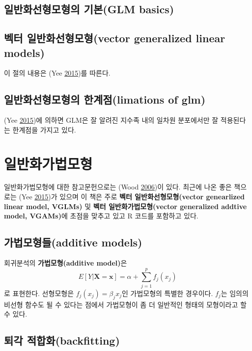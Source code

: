 \documentclass[b5paper,]{book}
\theoremstyle{definition}
\theoremstyle{definition}
\theoremstyle{definition}
\theoremstyle{remark}
\begin{document}
\section{일반화선형모형의 기본(GLM basics)}\label{-glm-basics}

\section{벡터 일반화선형모형(vector generalized linear
models)}\label{-vector-generalized-linear-models}

이 절의 내용은 (Yee \protect\hyperlink{ref-Yee2015}{2015})를 따른다.

\section{일반화선형모형의 한계점(limations of
glm)}\label{-limations-of-glm}

(Yee \protect\hyperlink{ref-Yee2015}{2015})에 의하면 GLM은 잘 알려진
지수족 내의 일차원 분포에서만 잘 적용된다는 한계점을 가지고 있다.

\chapter{일반화가법모형}\label{gam}

일반화가법모형에 대한 참고문헌으로는 (Wood
\protect\hyperlink{ref-Wood2006}{2006})이 있다. 최근에 나온 좋은
책으로는 (Yee \protect\hyperlink{ref-Yee2015}{2015})가 있으며 이 책은
주로 \textbf{벡터 일반화선형모형(vector genearlized linear model,
VGLMs)} 및 \textbf{벡터 일반화가법모형(vector generalized addtive model,
VGAMs)}에 초점을 맞추고 있고 R 코드를 포함하고 있다.

\section{가법모형들(additive models)}\label{additive-models}

회귀분석의 \textbf{가법모형(additive model)}은
\[E[Y|\mathbf{X}=\mathbf{x}]=\alpha+\sum_{j=1}^{p}f_{j}(x_j)\] 로
표현한다. 선형모형은 \(f_{j}(x_{j})=\beta_{j}x_{j}\)인 가법모형의 특별한
경우이다. \(f_{j}\)는 임의의 비선형 함수도 될 수 있다는 점에서
가법모형이 좀 더 일반적인 형태의 모형이라고 할 수 있다.

\section{퇴각 적합화(backfitting)}\label{-backfitting}
\end{document}
